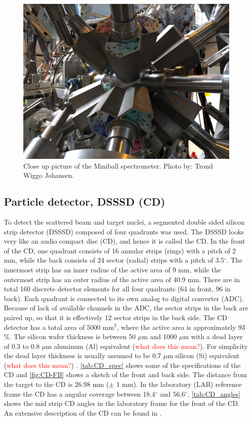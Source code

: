 \documentclass[twoside,english]{uiofysmaster/uiofysmaster}
\begin{document}
\begin{figure}[ht]
	\centering
	\includegraphics[width=\linewidth]{Images/IMG3917.JPG}
	\caption{Close up picture of the Miniball spectrometer. Photo by: Trond Wiggo Johansen.}
	\label{fig:MBSpectCU}
\end{figure}


\subsection{Particle detector, DSSSD (CD)}
To detect the scattered beam and target nuclei, a segmented double sided silicon strip detector (DSSSD) composed of four quadrants was used. The DSSSD looks very like an audio compact disc (CD), and hence it is called the CD. In the front of the CD, one quadrant consists of 16 annular strips (rings) with a pitch of 2 mm, while the back consists of 24 sector (radial) strips with a pitch of 3.5$^\circ$. The innermost strip has an inner radius of the active area of 9 mm, while the outermost strip has an outer radius of the active area of 40.9 mm. There are in total 160 discrete detector elements for all four quadrants (64 in front, 96 in back). Each quadrant is connected to its own analog to digital converter (ADC). Because of lack of available channels in the ADC, the sector strips in the back are paired up, so that it is effectively 12 sector strips in the back side. The CD detector has a total area of 5000 mm$^2$, where the active area is approximately 93$\%$. The silicon wafer thickness is between 50 $\mu$m and 1000 $\mu$m with a dead layer of 0.3 to 0.8 $\mu$m aluminum (Al) equivalent (\textcolor{red}{what does this mean?}). For simplicity the dead layer thickness is usually assumed to be 0.7 $\mu$m silicon (Si) equivalent (\textcolor{red}{what does this mean?}) \cite{NWarr-CD, MB-spect}. \autoref{tab:CD_spec} shows some of the specifications of the CD and \autoref{fig:CD-FB} shows a sketch of the front and back side. The distance from the target to the CD is 26.98 mm ($\pm$ 1 mm). In the laboratory (LAB) reference frame the CD has a angular coverage between 18.4$^\circ$ and 56.6$^\circ$. \autoref{tab:CD_angles} shows the mid strip CD angles in the laboratory frame for the front of the CD. An extensive description of the CD can be found in \cite{CD-DSSSD}.
\end{document}

